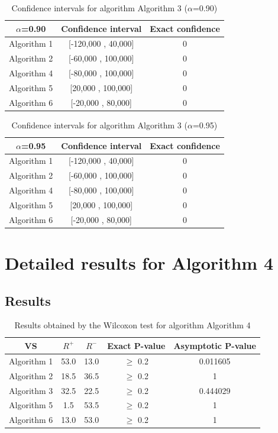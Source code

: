 \documentclass[a4paper,10pt]{article}
\begin{document}
\begin{table}[!htp]
\centering\small
\begin{tabular}{
|c|c|c|}
\hline
 $\alpha$=0.90 & Confidence interval & Exact confidence \\ \hline 
Algorithm 1 & [-120,000 , 40,000] & 0\\ \hline 
Algorithm 2 & [-60,000 , 100,000] & 0\\ \hline 
Algorithm 4 & [-80,000 , 100,000] & 0\\ \hline 
Algorithm 5 & [20,000 , 100,000] & 0\\ \hline 
Algorithm 6 & [-20,000 , 80,000] & 0\\ \hline 

\end{tabular}
\caption{Confidence intervals for algorithm Algorithm 3 ($\alpha$=0.90)}
\end{table}
\begin{table}[!htp]
\centering\small
\begin{tabular}{
|c|c|c|}
\hline
 $\alpha$=0.95 & Confidence interval & Exact confidence \\ \hline 
Algorithm 1 & [-120,000 , 40,000] & 0\\ \hline 
Algorithm 2 & [-60,000 , 100,000] & 0\\ \hline 
Algorithm 4 & [-80,000 , 100,000] & 0\\ \hline 
Algorithm 5 & [20,000 , 100,000] & 0\\ \hline 
Algorithm 6 & [-20,000 , 80,000] & 0\\ \hline 

\end{tabular}
\caption{Confidence intervals for algorithm Algorithm 3 ($\alpha$=0.95)}
\end{table}

 \clearpage 


\section{Detailed results for Algorithm 4}


\subsection{Results}

\begin{table}[!htp]
\centering\small
\begin{tabular}{
|c|c|c|c|c|}
\hline
 VS & $R^{+}$ & $R^{-}$ & Exact P-value & Asymptotic P-value \\ \hline 
Algorithm 1 & 53.0 & 13.0 & $\geq$ 0.2 & 0.011605\\ \hline 
Algorithm 2 & 18.5 & 36.5 & $\geq$ 0.2 & 1\\ \hline 
Algorithm 3 & 32.5 & 22.5 & $\geq$ 0.2 & 0.444029\\ \hline 
Algorithm 5 & 1.5 & 53.5 & $\geq$ 0.2 & 1\\ \hline 
Algorithm 6 & 13.0 & 53.0 & $\geq$ 0.2 & 1\\ \hline 

\end{tabular}
\caption{Results obtained by the Wilcoxon test for algorithm Algorithm 4}
\end{table}
\end{document}
